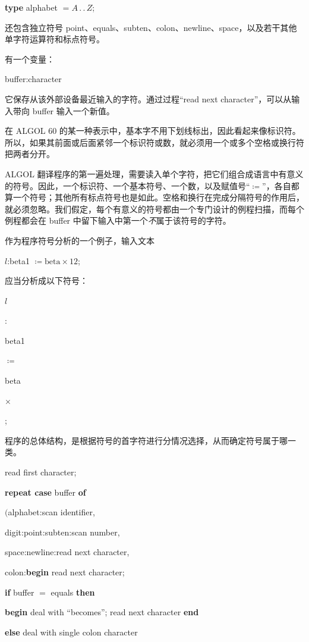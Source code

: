 \quad \textbf{type} alphabet $= A\,.\,.\,Z$;

\noindent
还包含独立符号 point、equals、subten、colon、newline、space，以及若干其他单字符运算符和标点符号。

有一个变量：

\quad buffer:character 

\noindent
它保存从该外部设备最近输入的字符。通过过程“read next character”，可以从输入带向 buffer 输入一个新值。

在 ALGOL 60 的某一种表示中，基本字不用下划线标出，因此看起来像标识符。所以，如果其前面或后面紧邻一个标识符或数，就必须用一个或多个空格或换行符把两者分开。

ALGOL 翻译程序的第一遍处理，需要读入单个字符，把它们组合成语言中有意义的符号。因此，一个标识符、一个基本符号、一个数，以及赋值号“$\coloneq$”，各自都算一个符号；其他所有标点符号也是如此。空格和换行在完成分隔符号的作用后，就必须忽略。我们假定，每个有意义的符号都由一个专门设计的例程扫描，而每个例程都会在 buffer 中留下输入中第一个\textit{不}属于该符号的字符。

作为程序符号分析的一个例子，输入文本

\quad $l$:beta1 $\coloneq \text{beta} \times 12$;

\noindent
应当分析成以下符号：

\quad $l$

\quad :

\quad beta1

\quad $\coloneq$

\quad beta

\quad $\times$


\quad ;

程序的总体结构，是根据符号的首字符进行分情况选择，从而确定符号属于哪一类。

read first character;

\textbf{repeat case} buffer \textbf{of}

\quad $($alphabet:scan identifier,

\quad digit:point:subten:scan number,

\quad space:newline:read next character,

\quad colon:\textbf{begin} read next character;

\quad\quad \textbf{if} buffer $=$ equals \textbf{then}

\quad\quad\quad \textbf{begin} deal with ``becomes''; read next character \textbf{end}

\quad\quad \textbf{else} deal with single colon character

